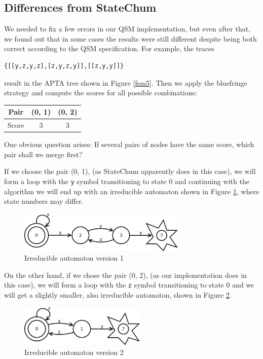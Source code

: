 \documentclass[]{sigplanconf}
\begin{document}
\subsection{Differences from StateChum}

We needed to fix a few errors in our QSM implementation, but even after that,
we found out that in some cases the results were still different despite
being both correct according to the QSM specification.
For example, the traces 
\begin{verbatim}
{[[y,z,y,z],[z,y,z,y]],[[z,y,y]]}
\end{verbatim}
result in the APTA tree shown in Figure \ref{fsm5}.
Then we apply the bluefringe strategy and compute the scores for all possible
combinations:

\begin{center}
\begin{tabular}{c||c|c}
Pair & (0, 1) & (0, 2)\\\hline\hline
Score & 3 & 3
\end{tabular}
\end{center}
One obvious question arises: If several pairs of nodes have the same score,
which pair shall we merge first?

If we choose the pair (0, 1), (as StateChum apparently does in this case), we will
form a loop with the \texttt{y} symbol transitioning to state 0 and continuing with
the algorithm we will end up with an irreducible automaton shown in Figure \ref{fsm6}, where state 
numbers may differ.

\begin{figure}
\begin{center}
\includegraphics[width=8cm]{pictures/fsm6.pdf}
\end{center}
\caption{Irreducible automaton version 1}
\label{fsm6}
\end{figure}
 
On the other hand, if we chose the pair (0, 2), (as our implementation does in this
case), we will form a loop with the \texttt{z} symbol transitioning to state 0 and
we will get a slightly smaller, also irreducible automaton, shown in Figure \ref{fsm7}.

\begin{figure}
\begin{center}
\includegraphics[width=6cm]{pictures/fsm7.pdf}
\end{center}
\caption{Irreducible automaton version 2}
\label{fsm7}
\end{figure}
\end{document}

